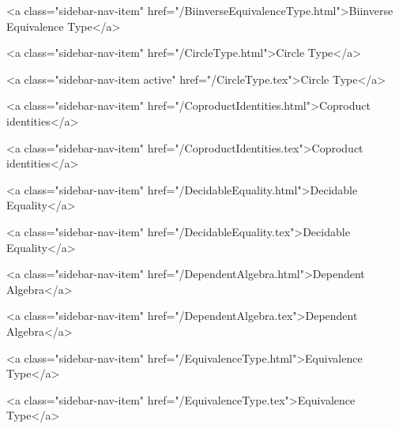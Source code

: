       
        
          <a class="sidebar-nav-item" href="/BiinverseEquivalenceType.html">Biinverse Equivalence Type</a>
        
      
    
      
        
          <a class="sidebar-nav-item" href="/CircleType.html">Circle Type</a>
        
      
    
      
        
          <a class="sidebar-nav-item active" href="/CircleType.tex">Circle Type</a>
        
      
    
      
        
          <a class="sidebar-nav-item" href="/CoproductIdentities.html">Coproduct identities</a>
        
      
    
      
        
          <a class="sidebar-nav-item" href="/CoproductIdentities.tex">Coproduct identities</a>
        
      
    
      
        
          <a class="sidebar-nav-item" href="/DecidableEquality.html">Decidable Equality</a>
        
      
    
      
        
          <a class="sidebar-nav-item" href="/DecidableEquality.tex">Decidable Equality</a>
        
      
    
      
        
          <a class="sidebar-nav-item" href="/DependentAlgebra.html">Dependent Algebra</a>
        
      
    
      
        
          <a class="sidebar-nav-item" href="/DependentAlgebra.tex">Dependent Algebra</a>
        
      
    
      
        
          <a class="sidebar-nav-item" href="/EquivalenceType.html">Equivalence Type</a>
        
      
    
      
        
          <a class="sidebar-nav-item" href="/EquivalenceType.tex">Equivalence Type</a>
        
